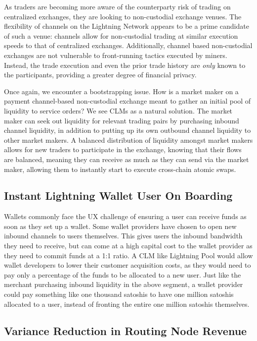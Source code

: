 \documentclass[10pt,a4paper]{article}
\theoremstyle{definition}
\begin{document}
As traders are becoming more aware of the counterparty risk of trading on
centralized exchanges, they are looking to non-custodial exchange venues. The
flexibility of channels on the Lightning Network appears to be a prime
candidate of such a venue: channels allow for non-custodial trading at similar
execution speeds to that of centralized exchanges. Additionally, channel based
non-custodial exchanges are not vulnerable to front-running tactics executed by
miners. Instead, the trade execution and even the prior trade history are
\emph{only} known to the participants, providing a greater degree of
financial privacy. 

Once again, we encounter a bootstrapping issue. How is a market maker on a
payment channel-based non-custodial exchange meant to gather an initial pool of
liquidity to service orders? We see CLMs as a natural solution. The market
maker can seek out liquidity for relevant trading pairs by purchasing inbound
channel liquidity, in addition to putting up its own outbound channel liquidity
to other market makers. A balanced distribution of liquidity amongst market
makers allows for new traders to participate in the exchange, knowing that
their flows are balanced, meaning they can receive as much as they can send via
the market maker, allowing them to instantly start to execute cross-chain
atomic swaps. 

\subsection{Instant Lightning Wallet User On Boarding}

Wallets commonly face the UX challenge of ensuring a user can receive funds as
soon as they set up a wallet. Some wallet providers have chosen to open new
inbound channels to users themselves. This gives users the inbound bandwidth
they need to receive, but can come at a high capital cost to the wallet
provider as they need to commit funds at a 1:1 ratio. A CLM like Lightning Pool would 
allow wallet developers to
lower their customer acquisition costs, as they would need to pay only a percentage of
the funds to be allocated to a new user. Just like the merchant purchasing
inbound liquidity in the above segment, a wallet provider could pay something like 
one thousand satoshis to have one million
satoshis allocated to a user, instead of fronting the entire one million satoshis
themselves.

\subsection{Variance Reduction in Routing Node Revenue}
\end{document}

